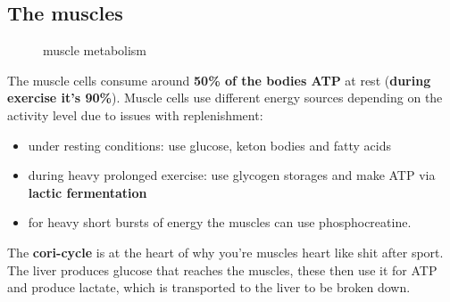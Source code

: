 \documentclass[../main.tex]{subfiles}
\begin{document}
\subsection{The muscles}
\begin{figure}[H]
	\centering
	\caption{muscle metabolism}
\end{figure}
The muscle cells consume around\textbf{ 50\% of the bodies ATP} at rest (\textbf{during exercise it's 90\%}). Muscle cells use different energy sources depending on the activity level due to issues with replenishment:
\begin{itemize}
    \item under resting conditions: use glucose, keton bodies and fatty acids
    \item during heavy prolonged exercise: use glycogen storages and make ATP via \textbf{lactic fermentation}
    \item for heavy short bursts of energy the muscles can use phosphocreatine.
\end{itemize}
The \textbf{\gls{cori-cycle}} is at the heart of why you're muscles heart like shit after sport. The liver produces glucose that reaches the muscles, these then use it for ATP and produce lactate, which is transported to the liver to be broken down.
\end{document}
